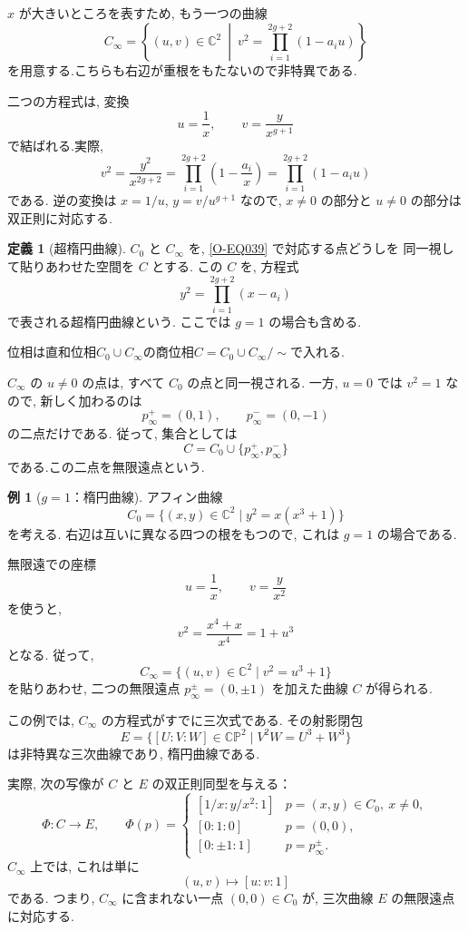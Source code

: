 \documentclass[dvipdfmx,a4paper,11pt]{article} %
\newcommand{\C}{\mathbb{C}}
\theoremstyle{definition}
\numberwithin{equation}{section}
\newtheorem{dfn}[thm]{定義}
\newtheorem{exa}[thm]{例}
\begin{document}
$x$ が大きいところを表すため, もう一つの曲線
\begin{equation}\label{O-EQ038}
C_\infty=\left\{(u,v)\in\C^2\ \middle|\
v^2=\prod_{i=1}^{2g+2}(1-a_i u)\right\}
\end{equation}
を用意する.こちらも右辺が重根をもたないので非特異である.

二つの方程式は, 変換
\begin{equation}\label{O-EQ039}
u=\frac1x,\qquad v=\frac{y}{x^{g+1}}
\end{equation}
で結ばれる.実際, 
\[
v^2
=\frac{y^2}{x^{2g+2}}
=\prod_{i=1}^{2g+2}\left(1-\frac{a_i}{x}\right)
=\prod_{i=1}^{2g+2}(1-a_i u)
\]
である.
逆の変換は $x=1/u$, $y=v/u^{g+1}$ なので, 
$x\neq0$ の部分と $u\neq0$ の部分は双正則に対応する.

\begin{dfn}[超楕円曲線]\label{O-M166}
$C_0$ と $C_\infty$ を, \eqref{O-EQ039} で対応する点どうしを
同一視して貼りあわせた空間を $C$ とする.
この $C$ を, 方程式
\[
y^2=\prod_{i=1}^{2g+2}(x-a_i)
\]
で表される超楕円曲線という.
ここでは $g=1$ の場合も含める.
\end{dfn}
位相は直和位相$C_0 \cup C_\infty$の商位相$C=C_0 \cup C_\infty/\sim$で入れる. 

$C_\infty$ の $u\neq0$ の点は, すべて $C_0$ の点と同一視される.
一方, $u=0$ では $v^2=1$ なので, 
新しく加わるのは
\[
p_\infty^+=(0,1),\qquad p_\infty^-=(0,-1)
\]
の二点だけである.
従って, 集合としては
\[
C=C_0\cup\{p_\infty^+,p_\infty^-\}
\]
である.この二点を無限遠点という.


\begin{exa}[$g=1$：楕円曲線]
アフィン曲線
\[
C_0=\{(x,y)\in\C^2\mid y^2=x(x^3+1)\}
\]
を考える.
右辺は互いに異なる四つの根をもつので, 
これは $g=1$ の場合である.

無限遠での座標
\[
u=\frac1x,\qquad v=\frac{y}{x^2}
\]
を使うと, 
\[
v^2=\frac{x^4+x}{x^4}=1+u^3
\]
となる.
従って, 
\[
C_\infty=\{(u,v)\in\C^2\mid v^2=u^3+1\}
\]
を貼りあわせ, 二つの無限遠点
$p_\infty^\pm=(0,\pm1)$ を加えた曲線 $C$ が得られる.

この例では, $C_\infty$ の方程式がすでに三次式である.
その射影閉包
\[
E=\{[U:V:W]\in\C\mathbb P^2\mid V^2W=U^3+W^3\}
\]
は非特異な三次曲線であり, 楕円曲線である.

実際, 次の写像が $C$ と $E$ の双正則同型を与える：
\[
\Phi:C\longrightarrow E,\qquad
\Phi(p)=
\begin{cases}
{}[1/x:y/x^2:1] & p=(x,y)\in C_0,\ x\neq0,\\
{}[0:1:0] & p=(0,0),\\
{}[0:\pm1:1] & p=p_\infty^\pm.
\end{cases}
\]
$C_\infty$ 上では, これは単に
\[
(u,v)\longmapsto[u:v:1]
\]
である.
つまり, $C_\infty$ に含まれない一点 $(0,0)\in C_0$ が, 
三次曲線 $E$ の無限遠点に対応する.
\end{exa}
\end{document}
